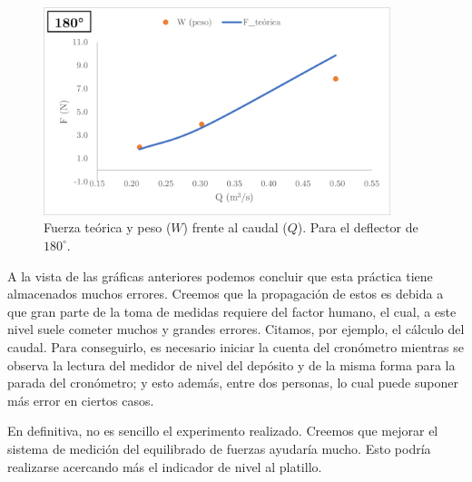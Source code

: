 \documentclass[12pt,a4paper]{article}
\newcommand{\grad}{^{\circ}}
\begin{document}
\begin{figure}[H]
 	 \begin{center}
  \includegraphics[width=0.9\textwidth]{fotos/Picture3}
  	 \end{center}
  	 \vspace{-0.3cm}
  	\caption{Fuerza teórica y peso ($W$) frente al caudal ($Q$). Para el deflector de $180\grad$.}
  	\label{fig14}
  	\vspace{-0.2cm}
\end{figure}

A la vista de las gráficas anteriores podemos concluir que esta práctica tiene almacenados muchos errores. Creemos que la propagación de estos es debida a que gran parte de la toma de medidas requiere del factor humano, el cual, a este nivel suele cometer muchos y grandes errores. Citamos, por ejemplo, el cálculo del caudal. Para conseguirlo, es necesario iniciar la cuenta del cronómetro mientras se observa la lectura del medidor de nivel del depósito y de la misma forma para la parada del cronómetro; y esto además, entre dos personas, lo cual puede suponer más error en ciertos casos. 

En definitiva, no es sencillo el experimento realizado. Creemos que mejorar el sistema de medición del equilibrado de fuerzas ayudaría mucho. Esto podría realizarse acercando más el indicador de nivel al platillo.
\end{document}
